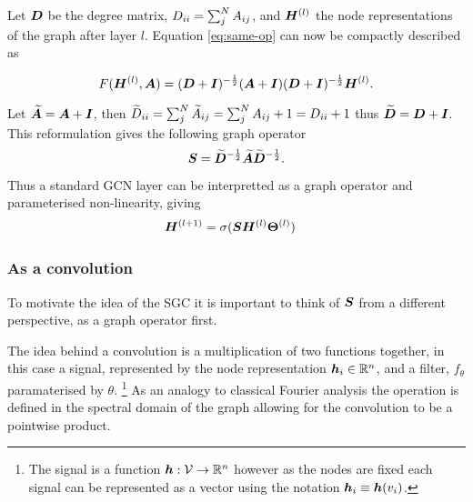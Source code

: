 Let ${\bm{D}}$ be the degree matrix, ${D}_{ii} = \sum_j^N {A}_{ij}$, and ${\bm{H}}^{(l)}$ the node representations of the graph after layer $l$. Equation \ref{eq:same-op} can now be compactly described as 

\begin{equation}
    F({\bm{H}}^{(l)}, {\bm{A}}) = ({\bm{D}} + {\bm{I}})^{-\frac12}({\bm{A}} + {\bm{I}})({\bm{D}} + {\bm{I}})^{-\frac12}{\bm{H}}^{(l)}.
\end{equation}

Let $\widetilde{{\bm{A}}} = {\bm{A}} + {\bm{I}}$, then $\widetilde{{D}}_{ii} = \sum_j^N \widetilde{{A}}_{ij} = \sum_j^N {A}_{ij} + 1 = {D}_{ii} + 1$ thus $\widetilde{{\bm{D}}} = {\bm{D}} + {\bm{I}}$.
This reformulation gives the following graph operator 
\begin{equation}
    \label{eq:op}
    {\bm{S}} = \widetilde{{\bm{D}}}^{-\frac12}\widetilde{{\bm{A}}}\widetilde{{\bm{D}}}^{-\frac12}.
\end{equation}

Thus a standard GCN layer can be interpretted as a graph operator and parameterised non-linearity, giving
\begin{align}
    \label{eq:GCN1}
    {\bm{H}}^{(l+1)} & = \sigma({\bm{S}}{\bm{H}}^{(l)}\bm{\Theta}^{(l)})
\end{align}


\subsubsection{As a convolution}
\label{sec:conv}

To motivate the idea of the SGC it is important to think of ${\bm{S}}$ from a different perspective, as a graph operator first.

The idea behind a convolution is a multiplication of two functions together, in this case a signal, represented by the node representation ${\bm{h}}_i \in \mathbb{R}^n$, and a filter, $f_\theta$ paramaterised by $\theta$.
\footnote{The signal is a function ${\bm{h}} : {\mathcal{V}} \to \mathbb{R}^n$ however as the nodes are fixed each signal can be represented as a vector using the notation ${\bm{h}}_i \equiv {\bm{h}}(v_i)$.}
As an analogy to classical Fourier analysis the operation is defined in the spectral domain of the graph allowing for the convolution to be a pointwise product.

